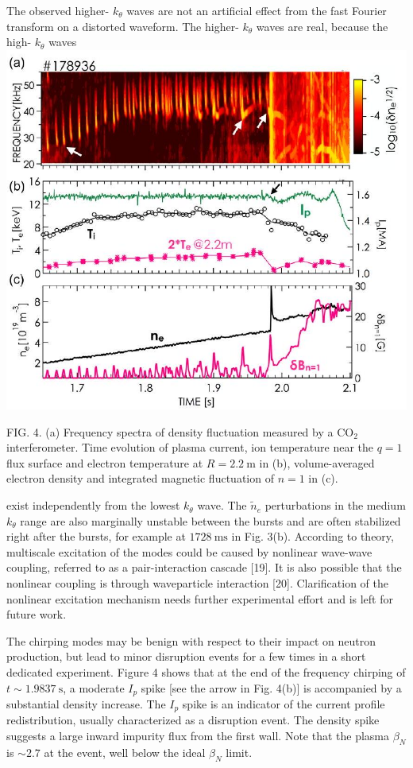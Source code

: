 \documentclass[10pt]{article}
\begin{document}
The observed higher- $k_{\theta}$ waves are not an artificial effect from the fast Fourier transform on a distorted waveform. The higher- $k_{\theta}$ waves are real, because the high- $k_{\theta}$ waves
\includegraphics[max width=\textwidth, center]{2023_06_19_f8dbb752866ca158c73eg-3}

FIG. 4. (a) Frequency spectra of density fluctuation measured by a $\mathrm{CO}_{2}$ interferometer. Time evolution of plasma current, ion temperature near the $q=1$ flux surface and electron temperature at $R=2.2 \mathrm{~m}$ in (b), volume-averaged electron density and integrated magnetic fluctuation of $n=1$ in (c).

exist independently from the lowest $k_{\theta}$ wave. The $\tilde{n}_{e}$ perturbations in the medium $k_{\theta}$ range are also marginally unstable between the bursts and are often stabilized right after the bursts, for example at $1728 \mathrm{~ms}$ in Fig. 3(b). According to theory, multiscale excitation of the modes could be caused by nonlinear wave-wave coupling, referred to as a pair-interaction cascade [19]. It is also possible that the nonlinear coupling is through waveparticle interaction [20]. Clarification of the nonlinear excitation mechanism needs further experimental effort and is left for future work.

The chirping modes may be benign with respect to their impact on neutron production, but lead to minor disruption events for a few times in a short dedicated experiment. Figure 4 shows that at the end of the frequency chirping of $t \sim 1.9837 \mathrm{~s}$, a moderate $I_{p}$ spike [see the arrow in Fig. 4(b)] is accompanied by a substantial density increase. The $I_{p}$ spike is an indicator of the current profile redistribution, usually characterized as a disruption event. The density spike suggests a large inward impurity flux from the first wall. Note that the plasma $\beta_{N}$ is $\sim 2.7$ at the event, well below the ideal $\beta_{N}$ limit.
\end{document}
